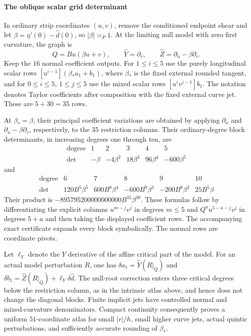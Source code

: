 \documentclass[11pt]{amsart}
\theoremstyle{definition}
\theoremstyle{remark}
\numberwithin{equation}{section}
\begin{document}
\paragraph{The oblique scalar grid determinant}
In ordinary strip coordinates $(u,v)$, remove the conditioned endpoint shear and let $\beta=\eta'(0)-\widehat d(0)$, so $|\beta|\asymp_P1$. At the limiting null model with zero first curvature, the graph is
\[
Q=B u(\beta u+v),\qquad \widehat Y=\partial_v,\qquad \widehat Z=\partial_u-\beta\partial_v.
\]
Keep the $16$ normal coefficient outputs. For $1\le i\le5$ use the purely longitudinal scalar rows $[u^{i-1}](\beta_*a_1+b_1)$, where $\beta_*$ is the fixed external rounded tangent, and for $0\le i\le5$, $1\le j\le5$ use the mixed scalar rows $[u^iv^{j-1}]b_1$. The notation denotes Taylor coefficients after composition with the fixed external curve jet. These are $5+30=35$ rows.

At $\beta_* =\beta$, their principal coefficient variations are obtained by applying $\partial_u$ and $\partial_u-\beta\partial_v$, respectively, to the $35$ restriction columns. Their ordinary-degree block determinants, in increasing degrees one through ten, are
\[
 \begin{array}{c|rrrrr}
 \text{degree}&1&2&3&4&5\\ \hline
 \det&-\beta&-4\beta^2&18\beta^3&96\beta^4&-600\beta^5
 \end{array}
\]
and
\[
 \begin{array}{c|rrrrr}
 \text{degree}&6&7&8&9&10\\ \hline
 \det&120B^5\beta^5&600B^8\beta^4&-600B^9\beta^3&-200B^8\beta^2&25B^5\beta
 \end{array}
\]
Their product is $-895795200000000000B^{35}\beta^{30}$. These formulas follow by differentiating the explicit columns $u^{m-j}v^j$ in degrees $m\le5$ and $Q^a u^{5-a-j}v^j$ in degrees $5+a$ and then taking the displayed coefficient rows. The accompanying exact certificate expands every block symbolically. The normal rows are coordinate pivots.

Let $\ell_Y$ denote the $Y$ derivative of the affine critical part of the model. For an actual model perturbation $R$, one has $\delta a_1=\widehat Y(R|_Q)$ and $\delta b_1=\widehat Z(R|_Q)+\ell_Y\delta\widehat d$. The null-root correction enters three critical degrees below the restriction column, as in the intrinsic atlas above, and hence does not change the diagonal blocks. Finite implicit jets have controlled normal and mixed-curvature denominators. Compact continuity consequently proves a uniform $51$-coordinate atlas for small $|r|/h$, small higher curve jets, actual quintic perturbations, and sufficiently accurate rounding of $\beta_*$. 
\end{document}
